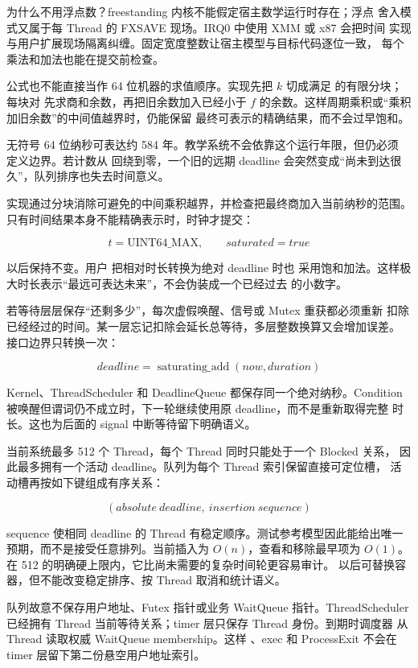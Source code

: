 为什么不用浮点数？freestanding 内核不能假定宿主数学运行时存在；浮点
舍入模式又属于每 Thread 的 FXSAVE 现场。IRQ0 中使用 XMM 或 x87 会把时间
实现与用户扩展现场隔离纠缠。固定宽度整数让宿主模型与目标代码逐位一致，
每个乘法和加法也能在提交前检查。

公式也不能直接当作 64 位机器的求值顺序。实现先把 \(k\) 切成满足
 的有限分块；每块对
 先求商和余数，再把旧余数加入已经小于
\(f\) 的余数。这样周期乘积或“乘积加旧余数”的中间值越界时，仍能保留
最终可表示的精确结果，而不会过早饱和。

无符号 64 位纳秒可表达约 584 年。教学系统不会依靠这个运行年限，但仍必须
定义边界。若计数从  回绕到零，一个旧的远期 deadline
会突然变成“尚未到达很久”，队列排序也失去时间意义。

实现通过分块消除可避免的中间乘积越界，并检查把最终商加入当前纳秒的范围。
只有时间结果本身不能精确表示时，时钟才提交：

\[
t=\mathrm{UINT64\_MAX},\qquad saturated=true
\]

以后保持不变。用户  把相对时长转换为绝对 deadline 时也
采用饱和加法。这样极大时长表示“最远可表达未来”，不会伪装成一个已经过去
的小数字。

若等待层层保存“还剩多少”，每次虚假唤醒、信号或 Mutex 重获都必须重新
扣除已经经过的时间。某一层忘记扣除会延长总等待，多层整数换算又会增加误差。
接口边界只转换一次：

\[
deadline=\operatorname{saturating\_add}(now,duration)
\]

Kernel、ThreadScheduler 和 DeadlineQueue 都保存同一个绝对纳秒。Condition
被唤醒但谓词仍不成立时，下一轮继续使用原 deadline，而不是重新取得完整
时长。这也为后面的 signal 中断等待留下明确语义。

当前系统最多 512 个 Thread，每个 Thread 同时只能处于一个 Blocked 关系，
因此最多拥有一个活动 deadline。队列为每个 Thread 索引保留直接可定位槽，
活动槽再按如下键组成有序关系：

\[
(absolute\ deadline,\ insertion\ sequence)
\]

sequence 使相同 deadline 的 Thread 有稳定顺序。测试参考模型因此能给出唯一
预期，而不是接受任意排列。当前插入为 \(O(n)\)，查看和移除最早项为
\(O(1)\)。在 512 的明确硬上限内，它比尚未需要的复杂时间轮更容易审计。
以后可替换容器，但不能改变稳定排序、按 Thread 取消和统计语义。

队列故意不保存用户地址、Futex 指针或业务 WaitQueue 指针。ThreadScheduler
已经拥有 Thread 当前等待关系；timer 层只保存 Thread 身份。到期时调度器
从 Thread 读取权威 WaitQueue membership。这样 、exec 和
ProcessExit 不会在 timer 层留下第二份悬空用户地址索引。

